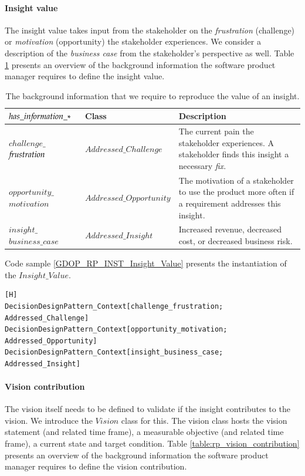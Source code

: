 \paragraph{Insight value}
The insight value takes input from the stakeholder on the \emph{frustration} (challenge) or \emph{motivation} (opportunity) the stakeholder experiences. We consider a description of the \emph{business case} from the stakeholder's perspective as well. Table \ref{table:rpp_insight_value} presents an overview of the background information the software product manager requires to define the insight value.

\begin{table}[H]
\centering
\caption{The background information that we require to reproduce the value of an insight.}
\begin{tabular}{| p{3cm} | p{4cm} | p{8cm} | }
\hline
\rowcolor{document}
\color{documentText}$has\_in{\mkern-2mu f\mkern-3mu}ormation\_*$ & \color{documentText}Class & \color{documentText}Description  \\
\hline
$challenge\_$ ${\mkern-2mu f\mkern-3mu}rustration$ & $Addressed\_Challenge$ & The current pain the stakeholder experiences. A stakeholder finds this insight a necessary \emph{fix}. \\
\hdashline
$opportunity\_$ $motivation$ & $Addressed\_Opportunity$ & The motivation of a stakeholder to use the product more often if a requirement addresses this insight. \\
\hdashline
$insight\_$ $business\_case$ & $Addressed\_Insight$ & Increased revenue, decreased cost, or decreased business risk. \\
\hline
\end{tabular}
\label{table:rpp_insight_value}
\end{table}

Code sample \ref{GDOP_RP_INST_Insight_Value} presents the instantiation of the $Insight\_Value$. 

\begin{lstlisting}[float,language=GDOL,caption={The GDOL instantiation code of the information reproducing the $Insight\_Value$},label={GDOP_RP_INST_Insight_Value}][H]
DecisionDesignPattern_Context[challenge_frustration; Addressed_Challenge]
DecisionDesignPattern_Context[opportunity_motivation; Addressed_Opportunity] 
DecisionDesignPattern_Context[insight_business_case; Addressed_Insight]
\end{lstlisting}

\paragraph{Vision contribution}
The vision itself needs to be defined to validate if the insight contributes to the vision. We introduce the $Vision$ class for this. The vision class hosts the vision statement (and related time frame), a measurable objective (and related time frame), a current state and target condition. Table \ref{table:rp_vision_contribution} presents an overview of the background information the software product manager requires to define the vision contribution. 

